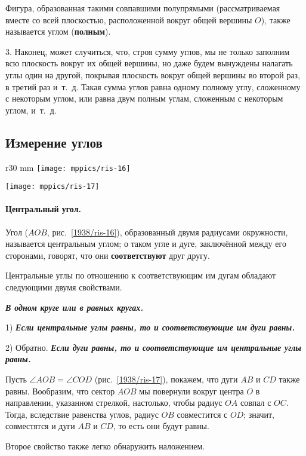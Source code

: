Фигура, образованная такими совпавшими полупрямыми (рассматриваемая вместе со всей плоскостью, расположенной вокруг общей вершины $O$), также называется углом (\textbf{полным}).


3.
Наконец, может случиться, что, строя сумму углов, мы не только заполним всю плоскость вокруг их общей вершины, но даже будем вынуждены налагать углы один на другой, покрывая плоскость вокруг общей вершины во второй раз, в третий раз и~т.~д.
Такая сумма углов равна одному полному углу, сложенному с некоторым углом, или равна двум полным углам, сложенным с некоторым углом, и~т.~д.

\subsection*{Измерение углов}

{

\begin{wrapfigure}{r}{30 mm}
\vskip-2mm
\centering
\texttt{[image: mppics/ris-16]}
\caption{}\label{1938/ris-16}
\bigskip
\texttt{[image: mppics/ris-17]}
\caption{}\label{1938/ris-17}
\end{wrapfigure}


\paragraph{Центральный угол.}\label{1938/17}
Угол ($AOB$, рис.~\ref{1938/ris-16}), образованный двумя радиусами окружности, называется центральным углом;
о таком угле и дуге, заключённой между его сторонами, говорят, что они \textbf{соответствуют} друг другу.

Центральные углы по отношению к соответствующим им дугам обладают следующими двумя свойствами.

\textbf{\emph{В одном круге или в равных кругах.}}

1) \textbf{\emph{Если центральные углы равны, то и соответствующие им дуги равны.}}

2) Обратно.
\textbf{\emph{Если дуги равны, то и соответствующие им центральные углы равны.}}


Пусть $\angle AOB=\angle COD$ (рис.~\ref{1938/ris-17}), покажем, что дуги $AB$ и $CD$ также равны.
Вообразим, что сектор $AOB$ мы повернули вокруг центра $O$ в направлении, указанном стрелкой, настолько, чтобы радиус $OA$ совпал с $OC$.
Тогда, вследствие равенства углов, радиус $OB$ совместится с $OD$;
значит, совместятся и дуги $AB$ и $CD$, то есть
они будут равны.

Второе свойство также легко обнаружить наложением.

}

